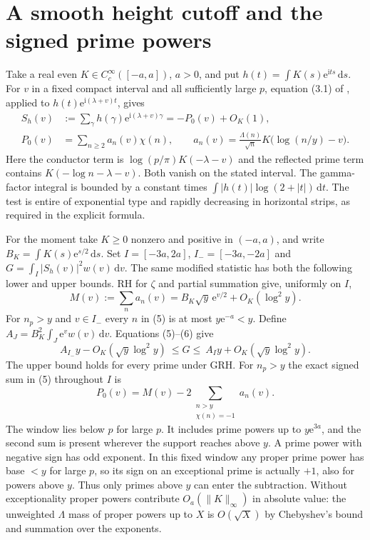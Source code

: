 \documentclass[11pt]{article}
\newcommand{\e}{\mathrm e}
\newcommand{\ii}{\mathrm i}
\newcommand{\wt}{\mathrm d}
\begin{document}
\section{A smooth height cutoff and the signed prime powers}
Take a real even $K\in C^\infty_c([-a,a])$, $a>0$, and put
$h(t)=\int K(s)\e^{\ii ts}\,\wt s$. For $v$ in a fixed compact
interval and all sufficiently large $p$, equation (3.1) of
\cite{cmqr}, applied to $h(t)\e^{\ii(\lambda+v)t}$, gives
\begin{align}
 S_h(v)&:=\sum_\gamma h(\gamma)\e^{\ii(\lambda+v)\gamma}
       =-P_0(v)+O_K(1),\nonumber\\
 P_0(v)&=\sum_{n\ge2}a_n(v)\chi(n),\qquad
 a_n(v)=\frac{\Lambda(n)}{\sqrt n}K\big(\log(n/y)-v\big).
 \tag{5}
\end{align}
Here the conductor term is $\log(p/\pi)K(-\lambda-v)$ and the
reflected prime term contains $K(-\log n-\lambda-v)$. Both vanish
on the stated interval. The gamma-factor integral is bounded by a
constant times $\int |h(t)|\log(2+|t|)\,\wt t$. The test is entire
of exponential type and rapidly decreasing in horizontal strips,
as required in the explicit formula.

For the moment take $K\ge0$ nonzero and positive in $(-a,a)$, and
write $B_K=\int K(s)\e^{s/2}\,\wt s$. Set
$I=[-3a,2a]$, $I_-=[-3a,-2a]$ and
$G=\int_I |S_h(v)|^2 w(v)\,\wt v$. The same modified statistic has
both the following lower and upper bounds. RH for $\zeta$ and
partial summation give, uniformly on $I$,
\[
 M(v):=\sum_n a_n(v)=B_K\sqrt y\,\e^{v/2}+O_K(\log^2 y).
 \tag{6}
\]
For $n_p>y$ and $v\in I_-$ every $n$ in (5) is at most $y\e^{-a}<y$.
Define $A_J=B_K^2\int_J\e^v w(v)\,\wt v$. Equations (5)--(6) give
\[
 A_{I_-}y-O_K(\sqrt y\log^2 y)\ \le G\le\
 A_Iy+O_K(\sqrt y\log^2 y).
 \tag{7}
\]
The upper bound holds for every prime under GRH. For $n_p>y$ the
exact signed sum in (5) throughout $I$ is
\[
  P_0(v)=M(v)-2\sum_{\substack{n>y\\\chi(n)=-1}}a_n(v).
  \tag{8}
\]
The window lies below $p$ for large $p$. It includes prime powers up
to $y\e^{3a}$, and the second sum is present wherever the support
reaches above $y$. A prime power with negative sign has odd exponent.
In this fixed window any proper prime power has base $<y$ for large
$p$, so its sign on an exceptional prime is actually $+1$, also for
powers above $y$. Thus only primes above $y$ can enter the subtraction.
Without exceptionality proper powers contribute $O_a(\|K\|_\infty)$
in absolute value: the unweighted $\Lambda$ mass of proper powers up
to $X$ is $O(\sqrt X)$ by Chebyshev's bound and summation over the
exponents.
\end{document}
